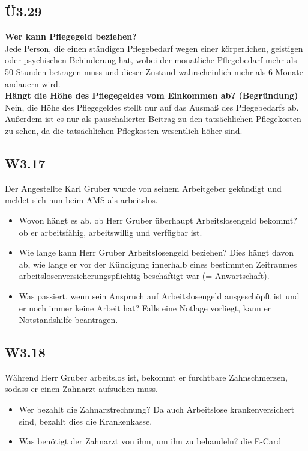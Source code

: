 	\subsection{Ü3.29}
		\textbf{Wer kann Pflegegeld beziehen?} \\
			Jede Person, die einen ständigen Pflegebedarf wegen einer körperlichen, geistigen oder psychischen Behinderung hat,
			wobei der monatliche Pflegebedarf mehr als 50 Stunden betragen muss und dieser Zustand wahrscheinlich mehr als
			6 Monate andauern wird. \\
		\textbf{Hängt die Höhe des Pflegegeldes vom Einkommen ab? (Begründung) } \\
			Nein, die Höhe des Pflegegeldes stellt nur auf das Ausmaß des Pflegebedarfs ab. Außerdem ist es nur als pauschalierter
			Beitrag zu den tatsächlichen Pflegekosten zu sehen, da die tatsächlichen Pflegkosten wesentlich höher sind.
			
	\subsection{W3.17}
		Der Angestellte Karl Gruber wurde von seinem Arbeitgeber gekündigt und meldet sich nun beim AMS als
		arbeitslos.
		\begin{itemize}
			\item  Wovon hängt es ab, ob Herr Gruber überhaupt Arbeitslosengeld bekommt?
			ob er arbeitsfähig, arbeitswillig und verfügbar ist.
			\item Wie lange kann Herr Gruber Arbeitslosengeld beziehen?
			Dies hängt davon ab, wie lange er vor der Kündigung innerhalb eines bestimmten Zeitraumes arbeitslosenversicherungspflichtig
			beschäftigt war (= Anwartschaft).
			\item Was passiert, wenn sein Anspruch auf Arbeitslosengeld ausgeschöpft ist und er noch immer keine Arbeit hat?
			Falls eine Notlage vorliegt, kann er Notstandshilfe beantragen.
		\end{itemize}
	
	\subsection{W3.18}
		Während Herr Gruber arbeitslos ist, bekommt er furchtbare Zahnschmerzen, sodass er einen Zahnarzt aufsuchen
		muss.
		\begin{itemize}
			\item Wer bezahlt die Zahnarztrechnung?
			Da auch Arbeitslose krankenversichert sind, bezahlt dies die Krankenkasse.
			\item Was benötigt der Zahnarzt von ihm, um ihn zu behandeln?
			die E-Card 
		\end{itemize}	
		
